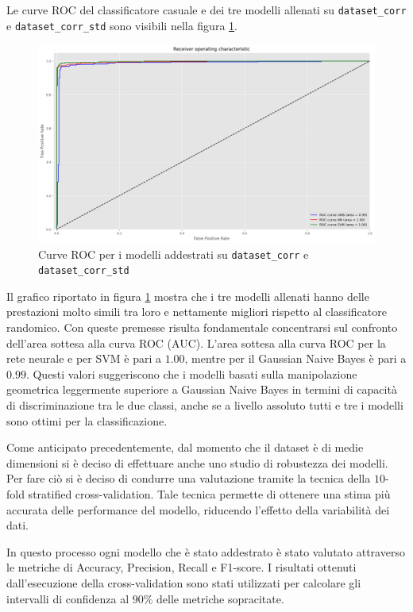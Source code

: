 Le curve ROC del classificatore casuale e dei tre modelli allenati su
\texttt{dataset\_corr} e \texttt{dataset\_corr\_std} sono visibili nella figura
\ref{fig:roc_curve_corr}.
\begin{figure}[!ht]
    \centering
    \includegraphics[width=\textwidth]{img/ris/roc_curve_corr.png}
    \caption{Curve ROC per i modelli addestrati su \texttt{dataset\_corr} e \texttt{dataset\_corr\_std}}
    \label{fig:roc_curve_corr}
\end{figure}

Il grafico riportato in figura \ref{fig:roc_curve_corr} mostra che i tre modelli
allenati hanno delle prestazioni molto simili tra loro e nettamente migliori
rispetto al classificatore randomico. Con queste premesse risulta fondamentale
concentrarsi sul confronto dell'area sottesa alla curva ROC (AUC). L'area sottesa
alla curva ROC per la rete neurale e per SVM è pari a $1.00$, mentre per il
Gaussian Naive Bayes è pari a $0.99$. Questi valori suggeriscono che i modelli
basati sulla manipolazione geometrica leggermente superiore a Gaussian Naive
Bayes in termini di capacità di discriminazione tra le due classi, anche se a
livello assoluto tutti e tre i modelli sono ottimi per la classificazione.

Come anticipato precedentemente, dal momento che il dataset è di medie
dimensioni si è deciso di effettuare anche uno studio di robustezza dei modelli.
Per fare ciò si è deciso di condurre una valutazione tramite la tecnica della
$10$-fold stratified cross-validation. Tale tecnica permette di ottenere una
stima più accurata delle performance del modello, riducendo l'effetto della
variabilità dei dati.

In questo processo ogni modello che è stato addestrato è stato valutato
attraverso le metriche di Accuracy, Precision, Recall e F1-score. I risultati
ottenuti dall'esecuzione della cross-validation sono stati utilizzati per
calcolare gli intervalli di confidenza al $90\%$ delle metriche sopracitate.

